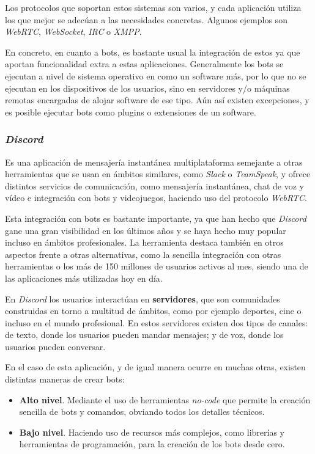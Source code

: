 Los protocolos que soportan estos sistemas son varios, y cada aplicación utiliza los que mejor se adecúan a las necesidades concretas. Algunos ejemplos son \textit{WebRTC}, \textit{WebSocket}, \textit{IRC} o \textit{XMPP}.

En concreto, en cuanto a bots, es bastante usual la integración de estos ya que aportan funcionalidad extra a estas aplicaciones. Generalmente los bots se ejecutan a nivel de sistema operativo en  como un software más, por lo que no se ejecutan en los dispositivos de los usuarios, sino en servidores y/o máquinas remotas encargadas de alojar software de ese tipo. Aún así existen excepciones, y es posible ejecutar bots como plugins o extensiones de un software.


\subsubsection{\textit{Discord}}

Es una aplicación de mensajería instantánea multiplataforma semejante a otras herramientas que se usan en ámbitos similares, como \textit{Slack} o \textit{TeamSpeak}, y ofrece distintos servicios de comunicación, como mensajería instantánea, chat de voz y vídeo e integración con bots y videojuegos, haciendo uso del protocolo \textit{WebRTC}.

Esta integración con bots es bastante importante, ya que han hecho que \textit{Discord} gane una gran visibilidad en los últimos años y se haya hecho muy popular incluso en ámbitos profesionales. La herramienta destaca también en otros aspectos\cite{earthweb} frente a otras alternativas, como la sencilla integración con otras herramientas o los más de 150 millones de usuarios activos al mes, siendo una de las aplicaciones más utilizadas hoy en día.

En \textit{Discord} los usuarios interactúan en \textbf{servidores}, que son comunidades construidas en torno a multitud de ámbitos, como por ejemplo deportes, cine o incluso en el mundo profesional. En estos servidores existen dos tipos de canales: de texto, donde los usuarios pueden mandar mensajes; y de voz, donde los usuarios pueden conversar.

En el caso de esta aplicación, y de igual manera ocurre en muchas otras, existen distintas maneras de crear bots:

\begin{itemize}
	\item \textbf{Alto nivel}. Mediante el uso de herramientas \textit{no-code} que permite la creación sencilla de bots y comandos, obviando todos los detalles técnicos.
	\item \textbf{Bajo nivel}. Haciendo uso de recursos más complejos, como librerías y herramientas de programación, para la creación de los bots desde cero.
\end{itemize}

